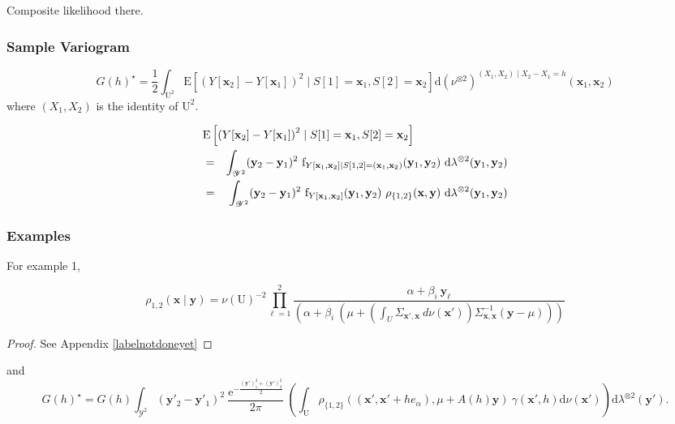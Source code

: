 \documentclass[12pt]{article}
\theoremstyle{definition}
\theoremstyle{remark}
\newcommand{\range}[1]{\mathscr{#1}}
\newcommand{\dominantU}{\nu}
\newcommand{\dominantY}{\lambda}
\newcommand{\derive}{\mathrm{d}}
\newcommand{\E}{\mathrm{E}}
\newcommand{\density}{\mathrm{f}}
\newcommand{\Semivariogram}{G}
\newcommand{\Sample}{S}
\newcommand{\Pop}{\mathrm{U}}
\newcommand{\position}{\mathbf{x}}
\newcommand{\Signal}{Y}
\newcommand{\signal}{\mathbf{y}}
\begin{document}
{\color{red} Composite likelihood there.}

\subsubsection{Sample Variogram}

$$\Semivariogram(h)^\star=\frac12\int_{\Pop^2} \E\left[\left(\Signal[\position_2]-\Signal[\position_1]\right)^2\mid \Sample[1]=\position_1,\Sample[2]=\position_2\right] \derive(\dominantU^{\otimes 2})^{(X_1,X_2)\mid X_2-X_1=h}(\position_1,\position_2)$$
where $(X_1,X_2)$ is the identity of $\Pop^2$.

\begin{eqnarray*}
\lefteqn{\E\left[\left(\Signal[\position_2]-\Signal[\position_1]\right)^2\mid \Sample[1]=\position_1,\Sample[2]=\position_2\right]}\\
&=&\int_{\range{\Signal}^2} (\signal_2-\signal_1)^2~
\density_{\Signal[\position_1,\position_2]\mid S[1,2]=(\position_1,\position_2)}(\signal_1,\signal_2)~
\derive\dominantY^{\otimes 2}(\signal_1,\signal_2) \\
&=&\int_{\range{\Signal}^2} (\signal_2-\signal_1)^2~ \density_{\Signal[\position_1,\position_2]}(\signal_1,\signal_2)~
\rho_{\{1,2\}}(\position,\signal)~
\derive\dominantY^{\otimes 2}(\signal_1,\signal_2) \\
\end{eqnarray*}

\subsubsection{Examples}

For example 1,

$$\rho_{1,2}(\position\mid\signal)=\dominantU(\Pop)^{-2}\prod_{\ell=1}^2 \frac{\alpha+\beta_i~\signal_\ell}{
\left(\alpha+\beta_i~(\mu+\left(\int_{U}\Sigma_{\position',\position}~d\dominantU\left(\position'\right)\right)\Sigma_{\position,\position}^{-1} (\signal-\mu))\right)
}$$

\begin{proof}
See Appendix \ref{labelnotdoneyet}
\end{proof}

and
$$\Semivariogram(h)^\star=
\Semivariogram(h)
\int_{\range{\Signal}^2} 
(\signal'_2-\signal'_1)^2~ \frac{\mathrm{e}^{-\frac{(\signal')_1^2+(\signal')_2^2}{2}}}{2\pi}~
\left(\int_{\Pop}
\rho_{\{1,2\}}((\position',\position'+h e_\alpha),\mu+A(h)\signal)~
\gamma(\position',h)
\derive\dominantU(\position')\right)
\derive\dominantY^{\otimes 2}(\signal'). 
$$
\end{document}
